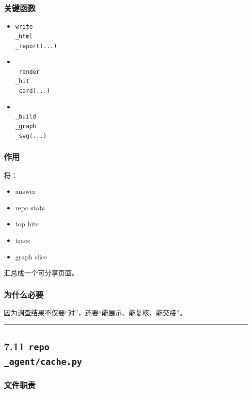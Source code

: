 \documentclass[UTF8,12pt,openany]{ctexbook}
\begin{document}
\subsubsection{关键函数}

\begin{itemize}
\item \texttt{write\\_html\\_report(...)}
\item \texttt{\\_render\\_hit\\_card(...)}
\item \texttt{\\_build\\_graph\\_svg(...)}
\end{itemize}

\subsubsection{作用}

将：\par

\begin{itemize}
\item answer
\item repo stats
\item top hits
\item trace
\item graph slice
\end{itemize}

汇总成一个可分享页面。\par

\subsubsection{为什么必要}

因为调查结果不仅要“对”，还要“能展示、能复核、能交接”。\par

\hrule

\subsection{7.11 \texttt{repo\\_agent/cache.py}}

\subsubsection{文件职责}
\end{document}

